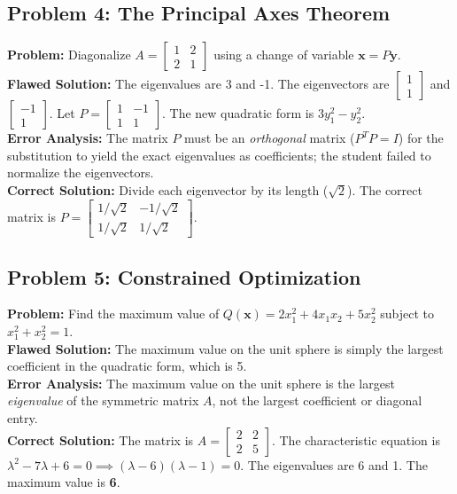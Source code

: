 \documentclass[11pt, letterpaper]{article}
\theoremstyle{definition}
\theoremstyle{remark}
\newcommand{\x}{\mathbf{x}}
\newcommand{\y}{\mathbf{y}}
\begin{document}
\subsection{Problem 4: The Principal Axes Theorem}
\textbf{Problem:} Diagonalize $A = \begin{bmatrix} 1 & 2 \\ 2 & 1 \end{bmatrix}$ using a change of variable $\x = P\y$. \\
\textbf{Flawed Solution:} The eigenvalues are 3 and -1. The eigenvectors are $\begin{bmatrix} 1 \\ 1 \end{bmatrix}$ and $\begin{bmatrix} -1 \\ 1 \end{bmatrix}$. Let $P = \begin{bmatrix} 1 & -1 \\ 1 & 1 \end{bmatrix}$. The new quadratic form is $3y_1^2 - y_2^2$. \\
\textbf{Error Analysis:} The matrix $P$ must be an \textit{orthogonal} matrix ($P^T P = I$) for the substitution to yield the exact eigenvalues as coefficients; the student failed to normalize the eigenvectors. \\
\textbf{Correct Solution:} Divide each eigenvector by its length ($\sqrt{2}$). The correct matrix is $P = \begin{bmatrix} 1/\sqrt{2} & -1/\sqrt{2} \\ 1/\sqrt{2} & 1/\sqrt{2} \end{bmatrix}$.

\subsection{Problem 5: Constrained Optimization}
\textbf{Problem:} Find the maximum value of $Q(\x) = 2x_1^2 + 4x_1 x_2 + 5x_2^2$ subject to $x_1^2 + x_2^2 = 1$. \\
\textbf{Flawed Solution:} The maximum value on the unit sphere is simply the largest coefficient in the quadratic form, which is 5. \\
\textbf{Error Analysis:} The maximum value on the unit sphere is the largest \textit{eigenvalue} of the symmetric matrix $A$, not the largest coefficient or diagonal entry. \\
\textbf{Correct Solution:} The matrix is $A = \begin{bmatrix} 2 & 2 \\ 2 & 5 \end{bmatrix}$. The characteristic equation is $\lambda^2 - 7\lambda + 6 = 0 \implies (\lambda - 6)(\lambda - 1) = 0$. The eigenvalues are 6 and 1. The maximum value is \textbf{6}.
\end{document}
